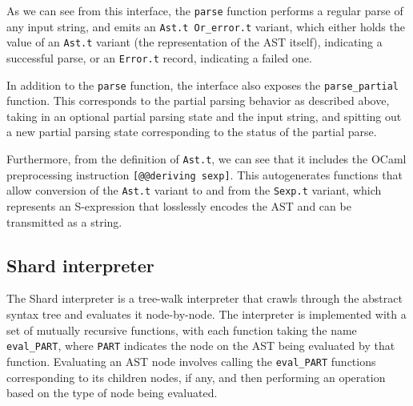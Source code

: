 \documentclass[oneside]{report}
\begin{document}
As we can see from this interface, the \texttt{parse} function performs a regular parse of any input string, and emits an \texttt{Ast.t Or\_error.t} variant, which either holds the value of an \texttt{Ast.t} variant (the representation of the AST itself), indicating a successful parse, or an \texttt{Error.t} record, indicating a failed one.

In addition to the \texttt{parse} function, the interface also exposes the \texttt{parse\_partial} function. This corresponds to the partial parsing behavior as described above, taking in an optional partial parsing state and the input string, and spitting out a new partial parsing state corresponding to the status of the partial parse.

Furthermore, from the definition of \texttt{Ast.t}, we can see that it includes the OCaml preprocessing instruction \texttt{[@@deriving sexp]}. This autogenerates functions that allow conversion of the \texttt{Ast.t} variant to and from the \texttt{Sexp.t} variant, which represents an S-expression that losslessly encodes the AST and can be transmitted as a string.

\subsection{Shard interpreter}

The Shard interpreter is a tree-walk interpreter that crawls through the abstract syntax tree and evaluates it node-by-node.
The interpreter is implemented with a set of mutually recursive functions, with each function taking the name \texttt{eval\_PART}, where \texttt{PART} indicates the node on the AST being evaluated by that function.
Evaluating an AST node involves calling the \texttt{eval\_PART} functions corresponding to its children nodes, if any, and then performing an operation based on the type of node being evaluated.


\end{document}
